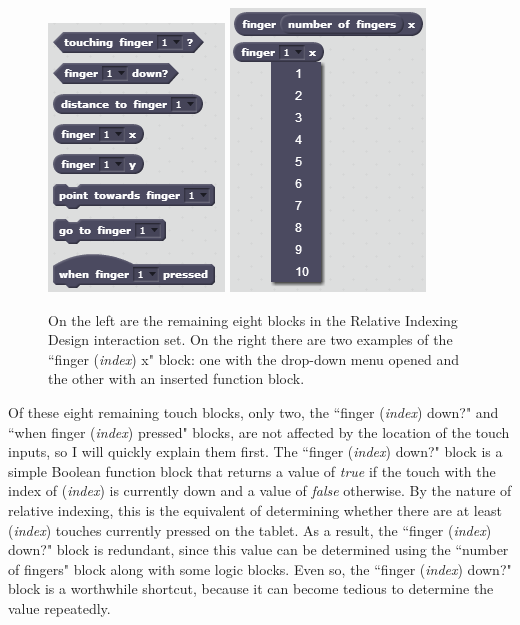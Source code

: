 \begin{figure}
\centering
\includegraphics{images/Relative_Indexing_Design_Block_Set.PNG}
\includegraphics{images/Relative_Indexing_Design_Block_Dropdown_Show.PNG}
\caption[Remaining Eight Blocks In The Relative Indexing Design Interaction Set]{On the left are the remaining eight blocks in the Relative Indexing Design interaction set.  On the right there are two examples of the ``finger (\emph{index}) x" block: one with the drop-down menu opened and the other with an inserted function block.}
\label{Relative_Indexing_Design_Block_Set}
\end{figure}

Of these eight remaining touch blocks, only two, the ``finger (\emph{index}) down?" and ``when finger (\emph{index}) pressed" blocks, are not affected by the location of the touch inputs, so I will quickly explain them first. The ``finger (\emph{index}) down?" block is a simple Boolean function block that returns a value of \emph{true} if the touch with the index of (\emph{index}) is currently down and a value of \emph{false} otherwise. By the nature of relative indexing, this is the equivalent of determining whether
there are at least (\emph{index}) touches currently pressed on the tablet. As a result, the ``finger (\emph{index}) down?" block is redundant, since this value can be determined using the ``number of fingers" block along with some logic blocks. Even so, the ``finger (\emph{index}) down?" block is a worthwhile shortcut, because it can become tedious to determine the value repeatedly.

